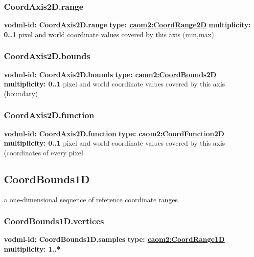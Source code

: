     \subsubsection{CoordAxis2D.range}
      \textbf{vodml-id: CoordAxis2D.range} \newline
      \textbf{type: \hyperref[sect:CoordRange2D]{caom2:CoordRange2D}} \newline
      \textbf{multiplicity: 0..1} \newline
      pixel and world coordinate values covered by this axis (min,max)

    \subsubsection{CoordAxis2D.bounds}
      \textbf{vodml-id: CoordAxis2D.bounds} \newline
      \textbf{type: \hyperref[sect:CoordBounds2D]{caom2:CoordBounds2D}} \newline
      \textbf{multiplicity: 0..1} \newline
      pixel and world coordinate values covered by this axis (boundary)

    \subsubsection{CoordAxis2D.function}
      \textbf{vodml-id: CoordAxis2D.function} \newline
      \textbf{type: \hyperref[sect:CoordFunction2D]{caom2:CoordFunction2D}} \newline
      \textbf{multiplicity: 0..1} \newline
      pixel and world coordinate values covered by this axis (coordinates of every pixel

  \subsection{CoordBounds1D}
  \label{sect:CoordBounds1D}
    a one-dimensional sequence of reference coordinate ranges

    \subsubsection{CoordBounds1D.vertices}
      \textbf{vodml-id: CoordBounds1D.samples} \newline
      \textbf{type: \hyperref[sect:CoordRange1D]{caom2:CoordRange1D}} \newline
      \textbf{multiplicity: 1..*} 

